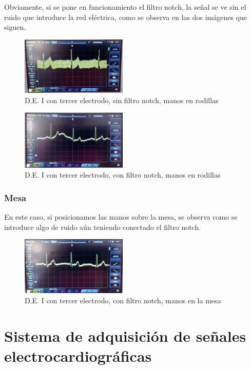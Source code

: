 \documentclass[conference]{IEEEtran}
\begin{document}
Obviamente, si se pone en funcionamiento el filtro notch, la señal se ve sin el ruido que introduce la red eléctrica, como se observa en las dos imágenes que siguen.
\begin{figure}[H]
    \centerline{\includegraphics[width=0.45\textwidth]{d_CONelectrodo_SINnotch.jpg}}
    \caption{D.E. I con tercer electrodo, sin filtro notch, manos en rodillas}
    \end{figure}

\begin{figure}[H]
    \centerline{\includegraphics[width=0.45\textwidth]{d_CONelectrodo_CONnotch.jpg}}
    \caption{D.E. I con tercer electrodo, con filtro notch, manos en rodillas}
    \end{figure}

\subsubsection{Mesa}
En este caso, si posicionamos las manos sobre la mesa, se observa como se introduce algo de ruido aún teniendo conectado el filtro notch.
\begin{figure}[H]
	\centerline{\includegraphics[width=0.45\textwidth]{d_CONelectrodoCONnotch_mesa}}
	\caption{D.E. I con tercer electrodo, con filtro notch, manos en la mesa}
	\end{figure}
    
\section{Sistema de adquisición de señales electrocardiográficas}
\end{document}

